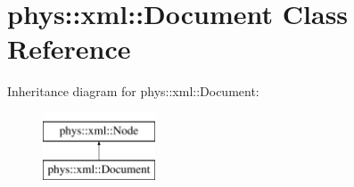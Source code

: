 \hypertarget{classphys_1_1xml_1_1Document}{
\section{phys::xml::Document Class Reference}
\label{dd/d44/classphys_1_1xml_1_1Document}
}
Inheritance diagram for phys::xml::Document:\begin{figure}[H]
\begin{center}
\leavevmode
\includegraphics[height=2cm]{dd/d44/classphys_1_1xml_1_1Document}
\end{center}
\end{figure}
